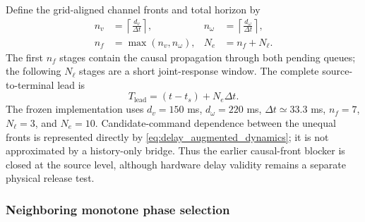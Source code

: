 Define the grid-aligned channel fronts and total horizon by
\begin{equation}
\begin{aligned}
  n_v&=\left\lceil\frac{d_v}{\Delta t}\right\rceil,
  &n_\omega&=\left\lceil\frac{d_\omega}{\Delta t}\right\rceil,\\
  n_f&=\max(n_v,n_\omega),
  &N_e&=n_f+N_\ell.
\end{aligned}
  \label{eq:execution_horizon}
\end{equation}
The first $n_f$ stages contain the causal propagation through both pending
queues; the following $N_\ell$ stages are a short joint-response window.  The
complete source-to-terminal lead is
\begin{equation}
  T_{\mathrm{lead}}=(t-t_s)+N_e\Delta t.
  \label{eq:total_lead}
\end{equation}
The frozen implementation uses $d_v=150$ ms, $d_\omega=220$ ms,
$\Delta t\simeq33.3$ ms, $n_f=7$, $N_\ell=3$, and $N_e=10$.  Candidate-command
dependence between the unequal fronts is represented directly by
\eqref{eq:delay_augmented_dynamics}; it is not approximated by a history-only
bridge.  Thus the earlier causal-front blocker is closed at the source level,
although hardware delay validity remains a separate physical release test.

\subsubsection{Neighboring monotone phase selection}

